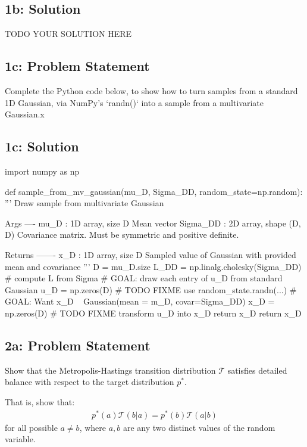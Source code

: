 \documentclass[10pt]{article}
\newcommand{\officialdirections}[1]{{\color{purple} #1}}
\begin{document}
\subsection{1b: Solution}
TODO YOUR SOLUTION HERE

\newpage 
\officialdirections{
\subsection*{1c: Problem Statement}
Complete the Python code below, to show how to turn samples from a standard 1D Gaussian, via NumPy's `randn()` into a sample from a multivariate Gaussian.x}

\subsection{1c: Solution}
\begin{python}
import numpy as np

def sample_from_mv_gaussian(mu_D, Sigma_DD, random_state=np.random):
	''' Draw sample from multivariate Gaussian

	Args
	----
	mu_D : 1D array, size D
		Mean vector
	Sigma_DD : 2D array, shape (D, D)
		Covariance matrix. Must be symmetric and positive definite.

	Returns
	-------
	x_D : 1D array, size D
		Sampled value of Gaussian with provided mean and covariance
	'''
	D = mu_D.size
	L_DD = np.linalg.cholesky(Sigma_DD) # compute L from Sigma
	# GOAL: draw each entry of u_D from standard Gaussian 
	u_D = np.zeros(D) # TODO FIXME use random_state.randn(...)
	# GOAL: Want x_D ~ Gaussian(mean = m_D, covar=Sigma_DD)
	x_D = np.zeros(D) # TODO FIXME transform u_D into x_D 
	return x_D
	return x_D
\end{python}



\officialdirections{
\subsection*{2a: Problem Statement}
Show that the Metropolis-Hastings transition distribution $\mathcal{T}$ satisfies detailed balance with respect to the target distribution $p^*$. 

That is, show that:
\begin{align}
p^*( a) \mathcal{T}( b | a)  = p^*(b) \mathcal{T}( a | b)
\end{align}
for all possible $a \neq b$, where $a, b$ are any two distinct values of the random variable.
}
\end{document}
